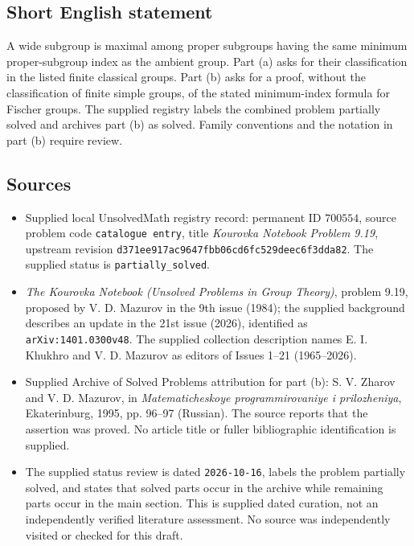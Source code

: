 \documentclass[11pt]{article}
\begin{document}
\subsection{Short English statement}
A wide subgroup is maximal among proper subgroups having the same minimum proper-subgroup index as the ambient group. Part (a) asks for their classification in the listed finite classical groups. Part (b) asks for a proof, without the classification of finite simple groups, of the stated minimum-index formula for Fischer groups. The supplied registry labels the combined problem partially solved and archives part (b) as solved. Family conventions and the notation in part (b) require review.
\subsection{Sources}
\begin{itemize}
\item Supplied local UnsolvedMath registry record: permanent ID \(700554\), source problem code \texttt{catalogue entry}, title \emph{Kourovka Notebook Problem 9.19}, upstream revision \texttt{d371ee917ac9647fbb06cd6fc529deec6f3dda82}. The supplied status is \texttt{partially\_solved}.
\item \emph{The Kourovka Notebook (Unsolved Problems in Group Theory)}, problem 9.19, proposed by V. D. Mazurov in the 9th issue (1984); the supplied background describes an update in the 21st issue (2026), identified as \texttt{arXiv:1401.0300v48}. The supplied collection description names E. I. Khukhro and V. D. Mazurov as editors of Issues 1--21 (1965--2026).
\item Supplied Archive of Solved Problems attribution for part (b): S. V. Zharov and V. D. Mazurov, in \emph{Matematicheskoye programmirovaniye i prilozheniya}, Ekaterinburg, 1995, pp. 96--97 (Russian). The source reports that the assertion was proved. No article title or fuller bibliographic identification is supplied.
\item The supplied status review is dated \texttt{2026-10-16}, labels the problem partially solved, and states that solved parts occur in the archive while remaining parts occur in the main section. This is supplied dated curation, not an independently verified literature assessment. No source was independently visited or checked for this draft.
\end{itemize}
\end{document}
